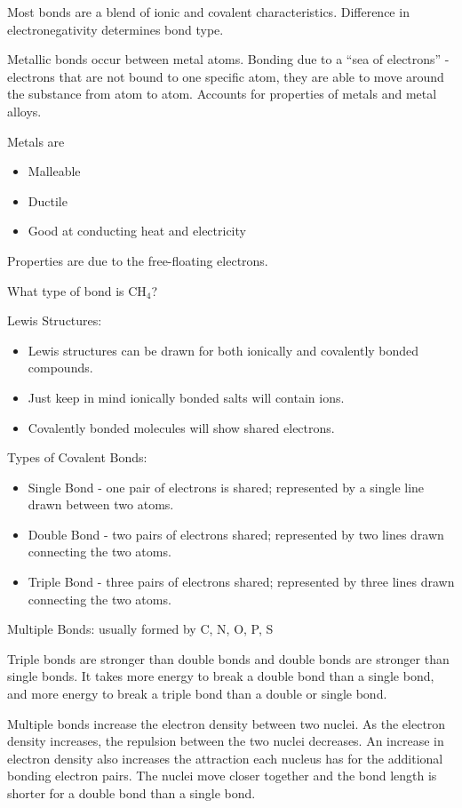 \documentclass[../hchem.tex]{subfiles}
\begin{document}
Most bonds are a blend of ionic and covalent characteristics. Difference in electronegativity determines bond type.

Metallic bonds occur between metal atoms. Bonding due to a ``sea of electrons'' - electrons that are not bound 
to one specific atom, they are able to move around the substance from atom to atom. Accounts for properties of metals and metal alloys.

Metals are 
\begin{itemize}
    \item Malleable 
    \item Ductile 
    \item Good at conducting heat and electricity 
\end{itemize}

Properties are due to the free-floating electrons.

\ex What type of bond is CH$_4$?

Lewis Structures:
\begin{itemize}
    \item Lewis structures can be drawn for both ionically and covalently bonded compounds.
    \item Just keep in mind ionically bonded salts will contain ions.
    \item Covalently bonded molecules will show shared electrons.
\end{itemize}

Types of Covalent Bonds:
\begin{itemize}
    \item Single Bond - one pair of electrons is shared; represented by a single line drawn between two atoms.
    \item Double Bond - two pairs of electrons shared; represented by two lines drawn connecting the two atoms.
    \item Triple Bond - three pairs of electrons shared; represented by three lines drawn connecting the two atoms. 
\end{itemize}

Multiple Bonds: usually formed by C, N, O, P, S

Triple bonds are stronger than double bonds and double bonds are stronger than single bonds.
It takes more energy to break a double bond than a single bond, and more energy to break a triple bond than a double or single bond.

Multiple bonds increase the electron density between two nuclei. As the electron density increases, the repulsion 
between the two nuclei decreases. An increase in electron density also increases the attraction each nucleus has for the additional 
bonding electron pairs. The nuclei move closer together and the bond length is shorter for a double bond than a single bond.
\end{document}
